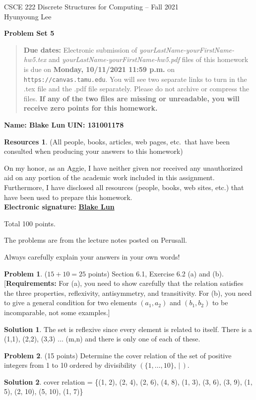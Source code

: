 \documentclass{article}
\theoremstyle{definition}
\newtheorem{problem}{Problem}
\newtheorem*{solution}{Solution}
\newtheorem*{resources}{Resources}
\newcommand{\name}[2]{\noindent\textbf{Name: #1}\hfill \textbf{UIN: #2}}
\newcommand{\honor}{\noindent On my honor, as an Aggie, I have neither
  given nor received any unauthorized aid on any portion of the
  academic work included in this assignment. Furthermore, I have
  disclosed all resources (people, books, web sites, etc.) that have
  been used to prepare this homework. \\[2ex]
 \textbf{Electronic signature:} \underline{ \textbf{Blake Lun} } }
\newcommand{\problemset}[1]{\begin{center}\textbf{Problem Set #1}\end{center}}
\newcommand{\duedate}[1]{\begin{quote}\textbf{Due dates:} Electronic
    submission of \textsl{yourLastName-yourFirstName-hw5.tex} and 
    \textsl{yourLastName-yourFirstName-hw5.pdf} files of this homework is due on
    \textbf{#1} on \texttt{https://canvas.tamu.edu}. You will see two separate links
    to turn in the .tex file and the .pdf file separately. Please do not archive or compress the files.  
    \textbf{If any of the two files are missing or unreadable, you will receive zero points for this
    homework.}\end{quote} }
\begin{document}
\vspace*{-20mm}
\begin{center}
{\large
CSCE 222 Discrete Structures for Computing -- Fall 2021\\[.5ex]
Hyunyoung Lee\\}
\end{center}
\problemset{5}
\duedate{Monday, 10/11/2021 11:59 p.m.}
\name{ Blake Lun }{ 131001178 }
\begin{resources} (All people, books, articles, web pages, etc.\ that
  have been consulted when producing your answers to this homework)
\end{resources}
\honor

\bigskip

\noindent
Total 100 points.

\bigskip

\noindent
The problems are from the lecture notes posted on Perusall.

\medskip

\noindent
Always carefully explain your answers in your own words!

\medskip

\begin{problem} ($15+10=25$ points) Section 6.1, Exercise 6.2 (a) and (b).
[\textbf{Requirements:} For (a), you need to show carefully that the relation satisfies the
three properties, reflexivity, antisymmetry, and transitivity.  For (b), you need to
give a general condition for two elements $(a_1, a_2)$ and $(b_1, b_2)$ to be
incomparable, not some examples.]
\end{problem}
\begin{solution} 
The set is reflexive since every element is related to itself. There is a (1,1), (2,2), (3,3) ... (m,n) and there is only one of each of these. \\

\end{solution}

\begin{problem} (15 points) Determine the cover relation of the set of positive integers
from 1 to 10 ordered by divisibility $(\{1, \ldots, 10\},\, | \, )$.

\smallskip
{}

\smallskip
{}
\end{problem}
\begin{solution} 
cover relation = \{(1, 2), (2, 4), (2, 6), (4, 8), (1, 3), (3, 6), (3, 9), (1, 5), (2, 10), (5, 10), (1, 7)\}
\end{solution}
\end{document}
